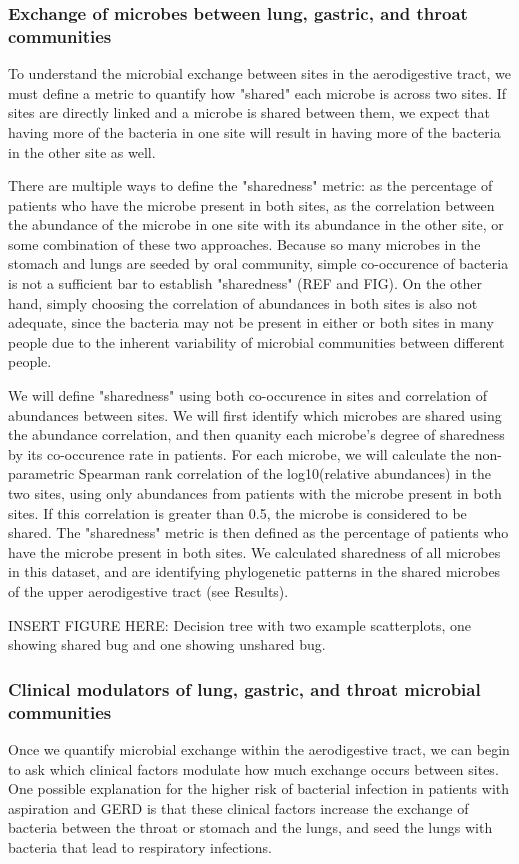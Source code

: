 \documentclass[12pt]{article}
\begin{document}
\subsubsection{Exchange of microbes between lung, gastric, and throat communities}
To understand the microbial exchange between sites in the aerodigestive tract, we must define a metric to quantify how "shared" each microbe is across two sites. If sites are directly linked and a microbe is shared between them, we expect that having more of the bacteria in one site will result in having more of the bacteria in the other site as well. 

There are multiple ways to define the "sharedness" metric: as the percentage of patients who have the microbe present in both sites, as the correlation between the abundance of the microbe in one site with its abundance in the other site, or some combination of these two approaches. Because so many microbes in the stomach and lungs are seeded by oral community, simple co-occurence of bacteria is not a sufficient bar to establish "sharedness" (REF and FIG). On the other hand, simply choosing the correlation of abundances in both sites is also not adequate, since the bacteria may not be present in either or both sites in many people due to the inherent variability of microbial communities between different people. 

We will define "sharedness" using both co-occurence in sites and correlation of abundances between sites. We will first identify which microbes are shared using the abundance correlation, and then quanity each microbe's degree of sharedness by its co-occurence rate in patients. For each microbe, we will calculate the non-parametric Spearman rank correlation of the log10(relative abundances) in the two sites, using only abundances from patients with the microbe present in both sites. If this correlation is greater than 0.5, the microbe is considered to be shared. The "sharedness" metric is then defined as the percentage of patients who have the microbe present in both sites. We calculated sharedness of all microbes in this dataset, and are identifying phylogenetic patterns in the shared microbes of the upper aerodigestive tract (see Results).

INSERT FIGURE HERE: Decision tree with two example scatterplots, one showing shared bug and one showing unshared bug.

\subsubsection{Clinical modulators of lung, gastric, and throat microbial communities}
Once we quantify microbial exchange within the aerodigestive tract, we can begin to ask which clinical factors modulate how much exchange occurs between sites. One possible explanation for the higher risk of bacterial infection in patients with aspiration and GERD is that these clinical factors increase the exchange of bacteria between the throat or stomach and the lungs, and seed the lungs with bacteria that lead to respiratory infections.
\end{document}
